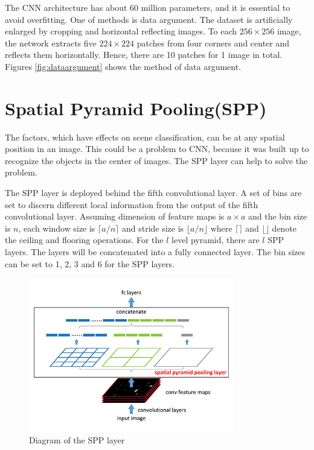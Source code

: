 The CNN architecture\citep{krizhevsky2012imagenet} has about 60 million parameters, and it is essential to avoid overfitting. One of methods is data argument. The dataset is artificially enlarged by cropping and horizontal reflecting images. To each $256\times256$ image, the network extracts five $224\times224$ patches from four corners and center and reflects them horizontally. Hence, there are 10 patches for 1 image in total. Figures \ref{fig:dataargument} shows the method of data argument.

\section{Spatial Pyramid Pooling(SPP)}

The factors, which have effects on scene classification, can be at any spatial position in an image. This could be a problem to CNN, because it was built up to recognize the objects in the center of images. The SPP layer can help to solve the problem.

The SPP layer is deployed behind the fifth convolutional layer. A set of bins are set to discern different local information from the output of the fifth convolutional layer. Assuming dimension of feature maps is $a\times a$ and the bin size is $n$, each window size is $\lceil a/n \rceil$ and stride size is $\lfloor a/n \rfloor$ where $\lceil  \rceil$ and $\lfloor  \rfloor$ denote the ceiling and flooring operations. For the $l$ level pyramid, there are $l$ SPP layers. The layers will be concatenated into a fully connected layer. The bin sizes can be set to 1, 2, 3 and 6 for the SPP layers.

\begin{figure}[htb]
    \centering
	\includegraphics[width=0.8\textwidth]{sppnet.jpg}
    \caption{Diagram of the SPP layer\citep{he2014spatial}}%
    \label{fig:sppnet}%
\end{figure}

